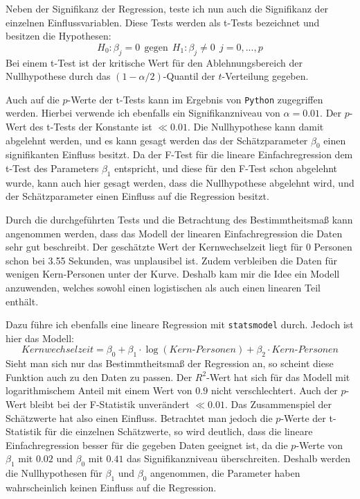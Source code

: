 Neben der Signifikanz der Regression, teste ich nun auch die Signifikanz der einzelnen Einflussvariablen. Diese Tests werden als t-Tests bezeichnet und besitzen die Hypothesen:
$$ H_0:\beta_j = 0 \ \ \text{gegen} \ \ H_1: \beta_j \neq 0 \ \ j = 0, ..., p$$
Bei einem t-Test ist der kritische Wert für den Ablehnungsbereich der Nullhypothese durch das $(1-\alpha/2)$-Quantil der $t$-Verteilung gegeben.

Auch auf die $p$-Werte der t-Tests kann im Ergebnis von \texttt{Python} zugegriffen werden. Hierbei verwende ich ebenfalls ein Signifikanzniveau von $\alpha = 0.01$. Der $p$-Wert des t-Tests der Konstante ist $\ll 0.01$. Die Nullhypothese kann damit abgelehnt werden, und es kann gesagt werden das der Schätzparameter $\beta_0$ einen signifikanten Einfluss besitzt. Da der F-Test für die lineare Einfachregression dem t-Test des Parameters $\beta_1$ entspricht, und diese für den F-Test schon abgelehnt wurde, kann auch hier gesagt werden, dass die Nullhypothese abgelehnt wird, und der Schätzparameter einen Einfluss auf die Regression besitzt.

Durch die durchgeführten Tests und die Betrachtung des Bestimmtheitsmaß kann angenommen werden, dass das Modell der linearen Einfachregression die Daten sehr gut beschreibt. Der geschätzte Wert der Kernwechselzeit liegt für 0 Personen schon bei 3.55 Sekunden, was unplausibel ist. Zudem verbleiben die Daten für wenigen Kern-Personen unter der Kurve. Deshalb kam mir die Idee ein Modell anzuwenden, welches sowohl einen logistischen als auch einen linearen Teil enthält.

Dazu führe ich ebenfalls eine lineare Regression mit \texttt{statsmodel} durch. Jedoch ist hier das Modell:
\begin{equation}
Kernwechselzeit = \beta_0 + \beta_1 \cdot \log(Kern\text{-}Personen) + \beta_2 \cdot Kern\text{-}Personen
\end{equation}
Sieht man sich nur das Bestimmtheitsmaß der Regression an, so scheint diese Funktion auch zu den Daten zu passen. Der $R^2$-Wert hat sich für das Modell mit logarithmischem Anteil mit einem Wert von $0.9$ nicht verschlechtert. Auch der $p$-Wert bleibt bei der F-Statistik unverändert $\ll 0.01$. Das Zusammenspiel der Schätzwerte hat also einen Einfluss. Betrachtet man jedoch die $p$-Werte der t-Statistik für die einzelnen Schätzwerte, so wird deutlich, dass die lineare Einfachregression besser für die gegeben Daten geeignet ist, da die $p$-Werte von $\beta_1$ mit $0.02$ und $\beta_0$ mit $0.41$ das Signifikanzniveau überschreiten. Deshalb werden die Nullhypothesen für $\beta_1$ und $\beta_0$ angenommen, die Parameter haben wahrscheinlich keinen Einfluss auf die Regression.

